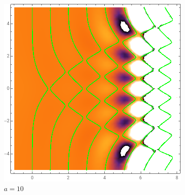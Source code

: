 \begin{figure}[h!]
    \centering
    \includegraphics{../img/dirac_10.png}
    \caption{$a=10$}
\end{figure}
